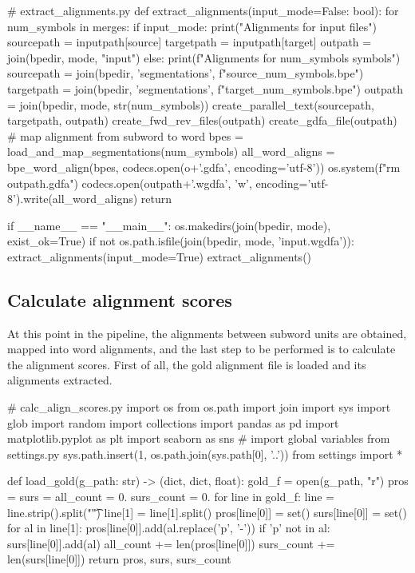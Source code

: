 \begin{python}
# extract_alignments.py
def extract_alignments(input_mode=False: bool):
  for num_symbols in merges:
    if input_mode:
      print("Alignments for input files")
      sourcepath = inputpath[source]
      targetpath = inputpath[target]
      outpath = join(bpedir, mode, "input")
    else:
      print(f"Alignments for {num_symbols} symbols")
      sourcepath = join(bpedir, 'segmentations', f"{source}_{num_symbols}.bpe")
      targetpath = join(bpedir, 'segmentations', f"{target}_{num_symbols}.bpe")
      outpath = join(bpedir, mode, str(num_symbols))
    create_parallel_text(sourcepath, targetpath, outpath)
    create_fwd_rev_files(outpath)
    create_gdfa_file(outpath)
    # map alignment from subword to word
    bpes = load_and_map_segmentations(num_symbols)
    all_word_aligns = bpe_word_align(bpes, codecs.open(o+'.gdfa', encoding='utf-8'))
    os.system(f"rm {outpath}.gdfa")
    codecs.open(outpath+'.wgdfa', 'w', encoding='utf-8').write(all_word_aligns)
  return

if __name__ == "__main__":
  os.makedirs(join(bpedir, mode), exist_ok=True)
  if not os.path.isfile(join(bpedir, mode, 'input.wgdfa')):
    extract_alignments(input_mode=True)
  extract_alignments()
\end{python}

\subsection{Calculate alignment scores}

At this point in the pipeline, the alignments between subword units are obtained, mapped into word alignments, and the last step to be performed is to calculate the alignment scores. First of all, the gold alignment file is loaded and its alignments extracted.

\begin{python}
# calc_align_scores.py
import os
from os.path import join
import sys
import glob
import random
import collections
import pandas as pd
import matplotlib.pyplot as plt
import seaborn as sns
# import global variables from settings.py
sys.path.insert(1, os.path.join(sys.path[0], '..'))
from settings import *

def load_gold(g_path: str) -> (dict, dict, float):
  gold_f = open(g_path, "r")
  pros = {}
  surs = {}
  all_count = 0.
  surs_count = 0.
  for line in gold_f:
    line = line.strip().split("\t")
    line[1] = line[1].split()
    pros[line[0]] = set()
    surs[line[0]] = set()
    for al in line[1]:
      pros[line[0]].add(al.replace('p', '-'))
      if 'p' not in al:
        surs[line[0]].add(al)
    all_count += len(pros[line[0]])
    surs_count += len(surs[line[0]])
  return pros, surs, surs_count
\end{python}

